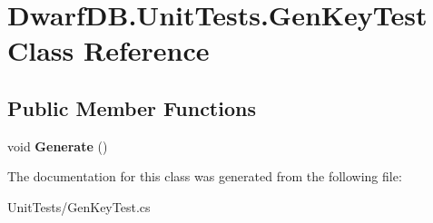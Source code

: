 \hypertarget{class_dwarf_d_b_1_1_unit_tests_1_1_gen_key_test}{\section{Dwarf\+D\+B.\+Unit\+Tests.\+Gen\+Key\+Test Class Reference}
\label{class_dwarf_d_b_1_1_unit_tests_1_1_gen_key_test}
}
\subsection*{Public Member Functions}
\begin{DoxyCompactItemize}
\item 
\hypertarget{class_dwarf_d_b_1_1_unit_tests_1_1_gen_key_test_a0e89588b4f783127393dcc7a1d83c75c}{void {\bfseries Generate} ()}\label{class_dwarf_d_b_1_1_unit_tests_1_1_gen_key_test_a0e89588b4f783127393dcc7a1d83c75c}

\end{DoxyCompactItemize}


The documentation for this class was generated from the following file\+:\begin{DoxyCompactItemize}
\item 
Unit\+Tests/Gen\+Key\+Test.\+cs\end{DoxyCompactItemize}
